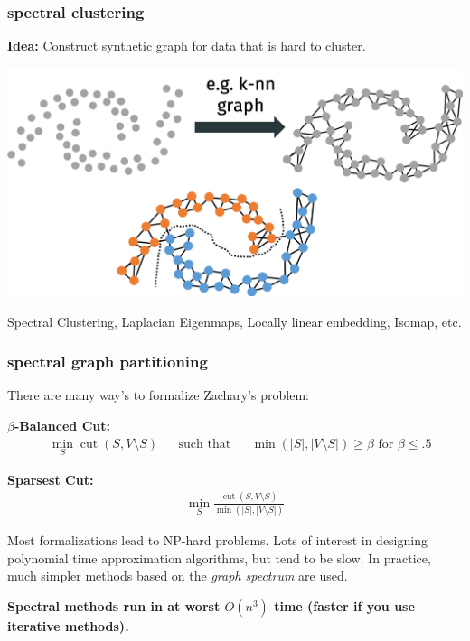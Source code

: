 \documentclass[compress]{beamer}
\DeclareMathOperator{\cut}{cut}
\begin{document}
\begin{frame}
	\frametitle{spectral clustering}
	\textbf{Idea:} Construct synthetic graph for data that is hard to cluster.
	
	\begin{center}
		\includegraphics[width=\textwidth]{cut_clustering.png}
		
		Spectral Clustering, Laplacian Eigenmaps, Locally linear embedding, Isomap, etc.
	\end{center}
	
\end{frame}

\begin{frame}[t]
	\frametitle{spectral graph partitioning}
	There are many way's to formalize Zachary's problem:
	
		\textbf{$\beta$-Balanced Cut:}
	\begin{align*}
		&\min_{S} {\cut(S, V\setminus S)} & &\text{such that} & &\min\left(|S|,|V\setminus S|\right) \geq \beta \text{ for } \beta \leq .5
	\end{align*}
	
	\textbf{Sparsest Cut:}
	\begin{align*}
		\min_{S} \frac{\cut(S, V\setminus S)}{\min\left(|S|,|V\setminus S|\right)}
	\end{align*}



	Most formalizations lead to NP-hard problems. Lots of interest in designing polynomial time approximation algorithms, but tend to be slow. In practice, much simpler methods based on the \emph{graph spectrum} are used. 
	
	\begin{center}
		\textbf{Spectral  methods run in at worst $O(n^3)$ time (faster if you use iterative methods).}
	\end{center}
\end{frame}
\end{document}
